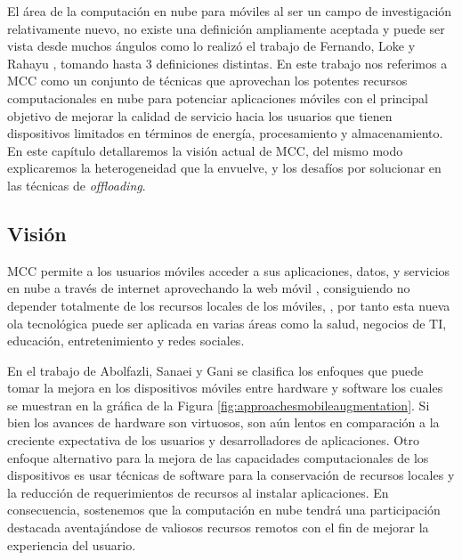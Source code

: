 \label{sec:mcc} %



El área de la computación en nube para móviles al ser un campo de investigación relativamente nuevo, no existe una definición
ampliamente aceptada y puede ser vista desde muchos ángulos como lo realizó el trabajo de  Fernando, Loke y Rahayu 
\cite{fernando2013mobile}, tomando hasta 3 definiciones distintas. En este trabajo nos referimos a MCC como un conjunto de técnicas que 
aprovechan los potentes recursos computacionales en nube para potenciar aplicaciones móviles con el principal objetivo de mejorar la calidad de 
servicio hacia los usuarios que tienen dispositivos limitados en términos de energía, procesamiento y almacenamiento. En este capítulo
detallaremos la visión actual de MCC, del mismo modo explicaremos la heterogeneidad que la envuelve,
y los desafíos por solucionar en las técnicas de \textit{offloading}.

\subsection{Visión}

MCC permite a los usuarios móviles acceder a sus aplicaciones, datos, y servicios en nube a través de internet aprovechando 
la web móvil \cite{dinh2013survey}, consiguiendo no depender totalmente de los recursos locales de los móviles,
, por tanto esta nueva ola tecnológica puede ser aplicada en varias áreas como la salud, negocios de TI, educación,
entretenimiento y redes sociales. 

En el trabajo de Abolfazli, Sanaei y Gani \cite{abolfazli2012mobile} se clasifica los enfoques
que puede tomar la mejora en los dispositivos móviles entre hardware y software los cuales se muestran en la gráfica de la Figura
\ref{fig:approachesmobileaugmentation}.  Si bien los avances de hardware son virtuosos, son aún lentos en comparación a la creciente 
expectativa de los usuarios y desarrolladores de aplicaciones. Otro enfoque alternativo para la mejora de las capacidades computacionales 
de los dispositivos es usar técnicas de software 
para la conservación de recursos
locales y la reducción de requerimientos de recursos al instalar aplicaciones. En consecuencia, sostenemos que la computación en nube 
tendrá una participación
destacada aventajándose de valiosos recursos remotos con el fin de mejorar la experiencia del usuario.

